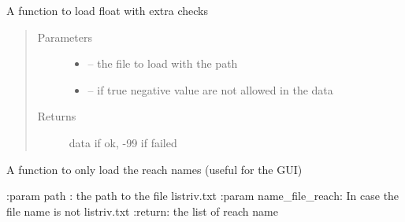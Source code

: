 \documentclass[letterpaper,10pt,english]{sphinxmanual}
\begin{document}
\begin{fulllineitems}
\label{\detokenize{index:src.stathab_c.load_float_stathab}}
A function to load float with extra checks
\begin{quote}\begin{description}
\item[{Parameters}] \leavevmode\begin{itemize}
\item {} 
 -- the file to load with the path

\item {} 
 -- if true negative value are not allowed in the data

\end{itemize}

\item[{Returns}] \leavevmode
data if ok, -99 if failed

\end{description}\end{quote}

\end{fulllineitems}


\begin{fulllineitems}
\label{\detokenize{index:src.stathab_c.load_namereach}}
A function to only load the reach names (useful for the GUI)

:param path : the path to the file listriv.txt
:param name\_file\_reach: In case the file name is not listriv.txt
:return: the list of reach name

\end{fulllineitems}

\end{document}
